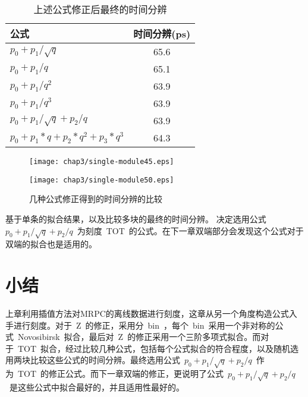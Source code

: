 \begin{table}[h]
    \centering
    \caption{\label{tbl:resolution} 上述公式修正后最终的时间分辨}
  \footnotesize
    \begin{tabular}{lc}
        \hline
        公式& 时间分辨(ps) \\
        \hline
        ${p_{0}+p_{1}/\sqrt{q}}$ & 65.6 \\
        ${p_{0}+p_{1}/q}$ & 65.1 \\
        ${p_{0}+p_{1}/q^{2}}$ & 63.9 \\
        ${p_{0}+p_{1}/q^{3}}$ & 63.9 \\
        ${p_{0}+p_{1}/\sqrt{q}+p_{2}/q}$ & 63.9 \\
        ${p_{0}+p_{1}*q+p_{2}*q^{2}+p_{3}*q^3}$ & 64.3 \\
        \hline
    \end{tabular}
\end{table}

\begin{figure}[!h]
\begin{minipage}[!h]{0.5\linewidth}
\texttt{[image: chap3/single-module45.eps]}
\label{fig:single-module45}
\end{minipage}%
\hfill
\begin{minipage}[!h]{0.5\linewidth}
\texttt{[image: chap3/single-module50.eps]}
\label{fig:single-module50}
\end{minipage}
\caption{几种公式修正得到的时间分辨的比较}
\end{figure}
基于单条的拟合结果，以及比较多块的最终的时间分辨。
决定选用公式~${p_{0}+p_{1}/\sqrt{q}+p_{2}/q}$~为刻度~TOT~的公式。在下一章双端部分会发现这个公式对于双端的拟合也是适用的。

\section{小结}

上章利用插值方法对MRPC的离线数据进行刻度，这章从另一个角度构造公式入手进行刻度。对于~Z~的修正，采用分~bin~，每个~bin~采用一个非对称的公式~Novosibirsk~拟合，最后对~Z~的修正采用一个三阶多项式拟合。而对于~TOT~拟合，经过比较几种公式，包括每个公式拟合的符合程度，以及随机选用两块比较这些公式的时间分辨。最终选用公式~${p_{0}+p_{1}/\sqrt{q}+p_{2}/q}$~作为~TOT~的修正公式。而下一章双端的修正，更说明了公式~${p_{0}+p_{1}/\sqrt{q}+p_{2}/q}$~是这些公式中拟合最好的，并且适用性最好的。










